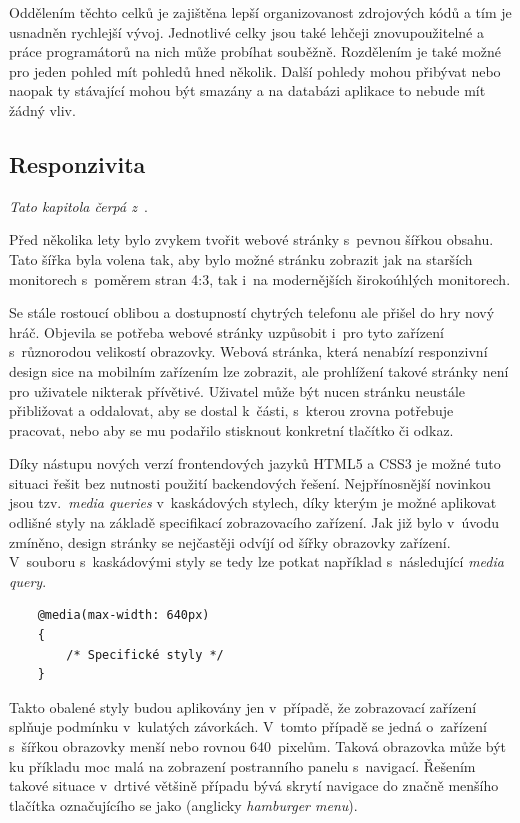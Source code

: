 Oddělením těchto celků je zajištěna lepší organizovanost zdrojových kódů a tím je usnadněn rychlejší vývoj. Jednotlivé celky jsou také lehčeji znovupoužitelné a práce programátorů na nich může probíhat souběžně. Rozdělením je také možné pro jeden pohled mít pohledů hned několik. Další pohledy mohou přibývat nebo naopak ty stávající mohou být smazány a na databázi aplikace to nebude mít žádný vliv.


\subsection{Responzivita}
\emph{Tato kapitola čerpá z~\cite{bib:responsive}}.

Před několika lety bylo zvykem tvořit webové stránky s~pevnou šířkou obsahu. Tato šířka byla volena tak, aby bylo možné stránku zobrazit jak na starších monitorech s~poměrem stran 4:3, tak i~na modernějších širokoúhlých monitorech. 

Se stále rostoucí oblibou a dostupností chytrých telefonu ale přišel do hry nový hráč. Objevila se potřeba webové stránky uzpůsobit i~pro tyto zařízení s~různorodou velikostí obrazovky. Webová stránka, která nenabízí responzivní design sice na mobilním zařízením lze zobrazit, ale prohlížení takové stránky není pro uživatele nikterak přívětivé. Uživatel může být nucen stránku neustále přibližovat a oddalovat, aby se dostal k~části, s~kterou zrovna potřebuje pracovat, nebo aby se mu podařilo stisknout konkretní tlačítko či odkaz. 

Díky nástupu nových verzí frontendových jazyků HTML5 a CSS3 je možné tuto situaci řešit bez nutnosti použití backendových řešení. Nejpřínosnější novinkou jsou tzv.~\emph{media queries} v~kaskádových stylech, díky kterým je možné aplikovat odlišné styly na základě specifikací zobrazovacího zařízení. Jak již bylo v~úvodu zmíněno, design stránky se nejčastěji odvíjí od šířky obrazovky zařízení. V~souboru s~kaskádovými styly se tedy lze potkat například s~následující \emph{media query}.

\begin{verbatim}
    @media(max-width: 640px)
    {
        /* Specifické styly */
    }
\end{verbatim}

Takto obalené styly budou aplikovány jen v~případě, že zobrazovací zařízení splňuje podmínku v~kulatých závorkách. V~tomto případě se jedná o~zařízení s~šířkou obrazovky menší nebo rovnou 640~pixelům. Taková obrazovka může být ku příkladu moc malá na zobrazení postranního panelu s~navigací. Řešením takové situace v~drtivé většině případu bývá skrytí navigace do značně menšího tlačítka označujícího se jako  (anglicky \emph{hamburger menu}).

